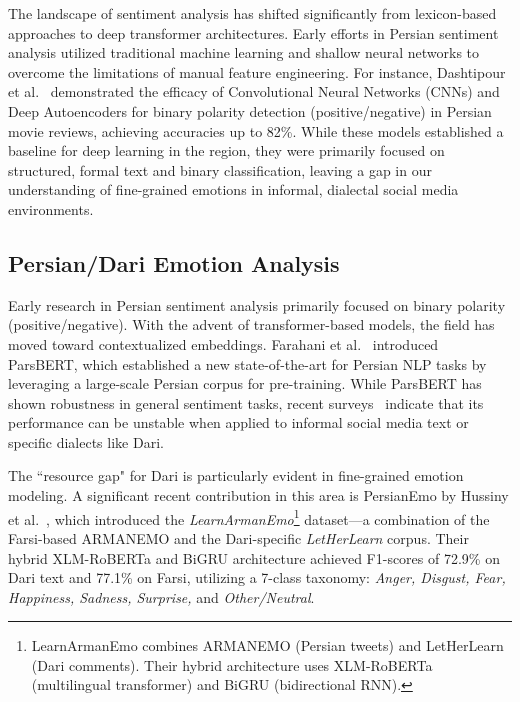 \documentclass[runningheads]{llncs}
\begin{document}
The landscape of sentiment analysis has shifted significantly from lexicon-based approaches to deep transformer architectures. Early efforts in Persian sentiment analysis utilized traditional machine learning and shallow neural networks to overcome the limitations of manual feature engineering. For instance, Dashtipour et al.~\cite{dashtipour2018exploiting} demonstrated the efficacy of Convolutional Neural Networks (CNNs) and Deep Autoencoders for binary polarity detection (positive/negative) in Persian movie reviews, achieving accuracies up to 82\%. While these models established a baseline for deep learning in the region, they were primarily focused on structured, formal text and binary classification, leaving a gap in our understanding of fine-grained emotions in informal, dialectal social media environments.
\subsection{Persian/Dari Emotion Analysis}
Early research in Persian sentiment analysis primarily focused on binary polarity (positive/negative). With the advent of transformer-based models, the field has moved toward contextualized embeddings. Farahani et al.~\cite{farahani2021parsbert} introduced ParsBERT, which established a new state-of-the-art for Persian NLP tasks by leveraging a large-scale Persian corpus for pre-training. While ParsBERT has shown robustness in general sentiment tasks, recent surveys~\cite{abaskohi2022persian} indicate that its performance can be unstable when applied to informal social media text or specific dialects like Dari.

The ``resource gap" for Dari is particularly evident in fine-grained emotion modeling. A significant recent contribution in this area is PersianEmo by Hussiny et al.~\cite{hussiny2024persianemo}, which introduced the \textit{LearnArmanEmo}\footnote{LearnArmanEmo combines ARMANEMO (Persian tweets) and LetHerLearn (Dari comments). Their hybrid architecture uses XLM-RoBERTa (multilingual transformer) and BiGRU (bidirectional RNN).} dataset—a combination of the Farsi-based ARMANEMO and the Dari-specific \textit{LetHerLearn} corpus. Their hybrid XLM-RoBERTa and BiGRU architecture achieved F1-scores of 72.9\% on Dari text and 77.1\% on Farsi, utilizing a 7-class taxonomy: \textit{Anger, Disgust, Fear, Happiness, Sadness, Surprise,} and \textit{Other/Neutral}.
\end{document}

